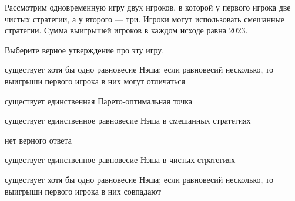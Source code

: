 
\begin{question}
Рассмотрим одновременную игру двух игроков, в которой у первого игрока две чистых стратегии, а у второго --- три. Игроки могут использовать смешанные стратегии.
Сумма выигрышей игроков в каждом исходе равна 2023.

Выберите верное утверждение про эту игру.
\begin{answerlist}
  \item существует хотя бы одно равновесие Нэша; если равновесий несколько, то выигрыши первого игрока в них могут отличаться
  \item существует единственная Парето-оптимальная точка
  \item существует единственное равновесие Нэша в смешанных стратегиях
  \item нет верного ответа
  \item существует единственное равновесие Нэша в чистых стратегиях
  \item существует хотя бы одно равновесие Нэша; если равновесий несколько, то выигрыши первого игрока в них совпадают
\end{answerlist}
\end{question}


